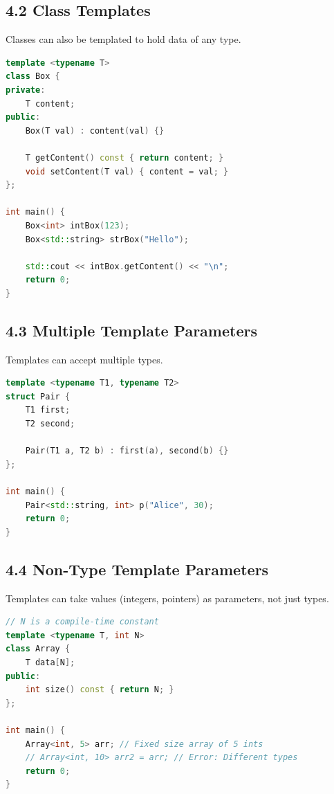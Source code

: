 \hypertarget{class-templates}{%
\subsection{4.2 Class Templates}\label{class-templates}}

Classes can also be templated to hold data of any type.

\begin{lstlisting}[language={C++}]
template <typename T>
class Box {
private:
    T content;
public:
    Box(T val) : content(val) {}
    
    T getContent() const { return content; }
    void setContent(T val) { content = val; }
};

int main() {
    Box<int> intBox(123);
    Box<std::string> strBox("Hello");
    
    std::cout << intBox.getContent() << "\n";
    return 0;
}
\end{lstlisting}

\hypertarget{multiple-template-parameters}{%
\subsection{4.3 Multiple Template
Parameters}\label{multiple-template-parameters}}

Templates can accept multiple types.

\begin{lstlisting}[language={C++}]
template <typename T1, typename T2>
struct Pair {
    T1 first;
    T2 second;
    
    Pair(T1 a, T2 b) : first(a), second(b) {}
};

int main() {
    Pair<std::string, int> p("Alice", 30);
    return 0;
}
\end{lstlisting}

\hypertarget{non-type-template-parameters}{%
\subsection{4.4 Non-Type Template
Parameters}\label{non-type-template-parameters}}

Templates can take values (integers, pointers) as parameters, not just
types.

\begin{lstlisting}[language={C++}]
// N is a compile-time constant
template <typename T, int N>
class Array {
    T data[N];
public:
    int size() const { return N; }
};

int main() {
    Array<int, 5> arr; // Fixed size array of 5 ints
    // Array<int, 10> arr2 = arr; // Error: Different types
    return 0;
}
\end{lstlisting}

